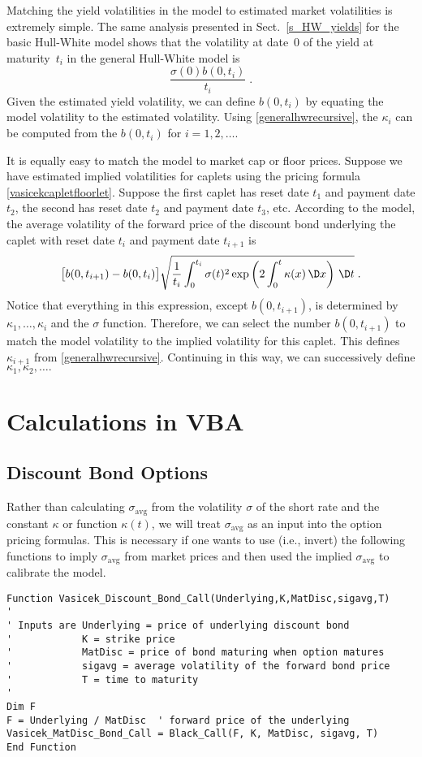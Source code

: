 Matching the yield volatilities in the model to estimated market volatilities is extremely simple.  The same analysis presented in Sect.~\ref{s_HW_yields} for the basic Hull-White model shows that  the volatility at date~0 of the yield at maturity~$t_i$ in the general Hull-White model  is
$$\frac{\sigma(0) b(0,t_i)}{t_i}\; .$$
Given the estimated yield volatility, we can define $b(0,t_i)$ by equating the model volatility to the estimated volatility.  Using \eqref{generalhwrecursive}, the $\kappa_i$ can be computed from the $b(0,t_i)$ for $i=1,2,\ldots$.

It is equally easy to match the model to market cap or floor prices.  Suppose we have estimated implied volatilities  for caplets using the pricing formula \eqref{vasicekcapletfloorlet}.  Suppose the first caplet has reset date $t_1$ and payment date $t_2$, the second has reset date $t_2$ and payment date $t_3$, etc.  According to the model, the average volatility of the forward price of the discount bond underlying the caplet with reset date $t_i$ and payment date $t_{i+1}$ is
$$ \big[b(0,t_{i+1})-b(0,t_i)\big]\sqrt{\frac{1}{t_i}\int_0^{t_i} \sigma(t)^2\exp\left(2\int_0^t\kappa(x)\,\D x\right)\,\D t}\; .$$
Notice that everything in this expression, except $b(0,t_{i+1})$, is
determined by $\kappa_1,\ldots,\kappa_i$ and the $\sigma$ function.  Therefore, we can select the number $b(0,t_{i+1})$ to match the model volatility to the implied volatility for this caplet.  This defines $\kappa_{i+1}$ from \eqref{generalhwrecursive}.  Continuing in this way, we can successively define $\kappa_1, \kappa_2, \ldots.$

\section{Calculations in VBA}

\subsection*{Discount Bond Options}
Rather than calculating $\sigma_{\text{avg}}$ from the volatility $\sigma$ of the short rate and the constant $\kappa$ or function $\kappa(t)$, we will treat $\sigma_{\text{avg}}$ as an input into the option pricing formulas.  This is necessary if one wants to use (i.e., invert) the following functions to imply $\sigma_{\text{avg}}$ from market prices and then used the implied $\sigma_{\text{avg}}$ to calibrate the model.

\small\begin{verbatim}
Function Vasicek_Discount_Bond_Call(Underlying,K,MatDisc,sigavg,T)
'
' Inputs are Underlying = price of underlying discount bond
'            K = strike price
'            MatDisc = price of bond maturing when option matures
'            sigavg = average volatility of the forward bond price
'            T = time to maturity
'
Dim F
F = Underlying / MatDisc  ' forward price of the underlying
Vasicek_MatDisc_Bond_Call = Black_Call(F, K, MatDisc, sigavg, T)
End Function
\end{verbatim}\normalsize


